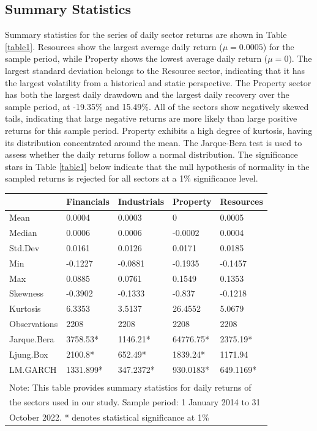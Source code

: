 \documentclass[11pt,preprint, authoryear]{elsarticle}
\let\origtable\table
\let\endorigtable\endtable
\renewenvironment{table}[1][2] {
    \expandafter\origtable\expandafter[H]
} {
    \endorigtable
}
\numberwithin{equation}{section}
\numberwithin{figure}{section}
\numberwithin{table}{section}
\begin{document}
\hypertarget{summary-statistics}{%
\subsection{Summary Statistics}\label{summary-statistics}}

Summary statistics for the series of daily sector returns are shown in
Table \ref{table1}. Resources show the largest average daily return
(\(\mu = 0.0005\)) for the sample period, while Property shows the
lowest average daily return (\(\mu = 0\)). The largest standard
deviation belongs to the Resource sector, indicating that it has the
largest volatility from a historical and static perspective. The
Property sector has both the largest daily drawdown and the largest
daily recovery over the sample period, at -19.35\% and 15.49\%. All of
the sectors show negatively skewed tails, indicating that large negative
returns are more likely than large positive returns for this sample
period. Property exhibits a high degree of kurtosis, having its
distribution concentrated around the mean. The Jarque-Bera test is used
to assess whether the daily returns follow a normal distribution. The
significance stars in Table \ref{table1} below indicate that the null
hypothesis of normality in the sampled returns is rejected for all
sectors at a 1\% significance level.

\begin{table}

\caption{\label{tab:table1}Summary Statistics and Test Scores for Sectors \label{table1}}
\centering
\fontsize{9}{11}\selectfont
\begin{tabular}[t]{l|l|l|l|l}
\hline
  & Financials & Industrials & Property & Resources\\
\hline
Mean & 0.0004 & 0.0003 & 0 & 0.0005\\
\hline
Median & 0.0006 & 0.0006 & -0.0002 & 0.0004\\
\hline
Std.Dev & 0.0161 & 0.0126 & 0.0171 & 0.0185\\
\hline
Min & -0.1227 & -0.0881 & -0.1935 & -0.1457\\
\hline
Max & 0.0885 & 0.0761 & 0.1549 & 0.1353\\
\hline
Skewness & -0.3902 & -0.1333 & -0.837 & -0.1218\\
\hline
Kurtosis & 6.3353 & 3.5137 & 26.4552 & 5.0679\\
\hline
Observations & 2208 & 2208 & 2208 & 2208\\
\hline
Jarque.Bera & 3758.53* & 1146.21* & 64776.75* & 2375.19*\\
\hline
Ljung.Box & 2100.8* & 652.49* & 1839.24* & 1171.94\\
\hline
LM.GARCH & 1331.899* & 347.2372* & 930.0183* & 649.1169*\\
\hline
\multicolumn{5}{l}{\textsuperscript{} Note: This table provides summary statistics for daily returns of}\\
\multicolumn{5}{l}{the sectors used in our study. Sample period: 1 January 2014 to 31}\\
\multicolumn{5}{l}{October 2022. * denotes statistical significance at 1\%}\\
\end{tabular}
\end{table}
\end{document}
